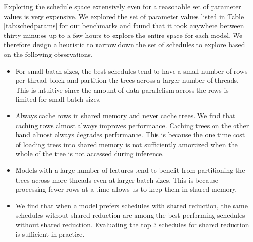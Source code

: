 Exploring the schedule space extensively even for a reasonable set of parameter values
is very expensive. We explored the set of parameter values listed in Table \ref{tab:schedparams}
for our benchmarks and found that it took anywhere between thirty minutes up to a few hours
to explore the entire space for each model. 
We therefore
design a heuristic to narrow down the set of schedules to explore based on the following 
observations.
\begin{itemize}
  \item For small batch sizes, the best schedules tend to have a small number of rows
  per thread block and partition the trees across a larger number of threads. This is 
  intuitive since the amount of data parallelism across the rows is limited for small batch sizes.
  \item Always cache rows in shared memory and never cache trees. We find that caching rows 
  almost always improves performance. Caching trees on the other hand almost always degrades 
  performance. This is because the one time cost of loading trees into shared memory is 
  not sufficiently amortized when the whole of the tree is not accessed during inference. 
  \item Models with a large number of features tend to benefit from partitioning the 
  trees across more threads even at larger batch sizes. This is because processing fewer rows at a time 
  allows us to keep them in shared memory.
  \item We find that when a model prefers schedules with shared reduction, the same schedules 
  without shared reduction are among the best performing schedules without shared reduction.
  Evaluating the top 3 schedules for shared reduction is sufficient in practice.  
\end{itemize}

